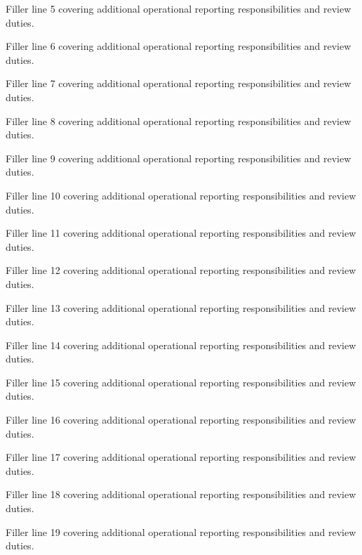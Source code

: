\documentclass[fontsize=11pt, margin=narrow, medium=print]{careerdossier-resume}
\begin{document}
\begin{CDossierEntry}[title = {Modernization Program}, organization = {Continental Reliability Consortium}, location = {Ottawa, ON}, dates = {2019--Present}]
\begin{CDossierItemize}
    \item Filler line 5 covering additional operational reporting responsibilities and review duties.
    \item Filler line 6 covering additional operational reporting responsibilities and review duties.
    \item Filler line 7 covering additional operational reporting responsibilities and review duties.
    \item Filler line 8 covering additional operational reporting responsibilities and review duties.
    \item Filler line 9 covering additional operational reporting responsibilities and review duties.
    \item Filler line 10 covering additional operational reporting responsibilities and review duties.
    \item Filler line 11 covering additional operational reporting responsibilities and review duties.
    \item Filler line 12 covering additional operational reporting responsibilities and review duties.
    \item Filler line 13 covering additional operational reporting responsibilities and review duties.
    \item Filler line 14 covering additional operational reporting responsibilities and review duties.
    \item Filler line 15 covering additional operational reporting responsibilities and review duties.
    \item Filler line 16 covering additional operational reporting responsibilities and review duties.
    \item Filler line 17 covering additional operational reporting responsibilities and review duties.
    \item Filler line 18 covering additional operational reporting responsibilities and review duties.
    \item Filler line 19 covering additional operational reporting responsibilities and review duties.
  \end{CDossierItemize}
\end{CDossierEntry}
\end{document}
